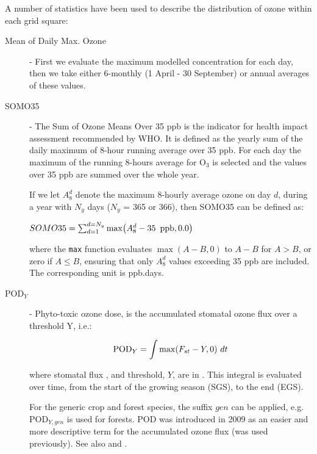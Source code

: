 \noindent

A number of statistics have been used to describe the distribution of
ozone within each grid square:\\
\begin{description}

     \item[Mean of Daily Max. Ozone] - First we evaluate the maximum
modelled concentration for each day, then we take either 6-monthly
(1 April - 30 September) or annual averages of these values.

     \item[SOMO35] - The Sum of Ozone Means Over 35 ppb is the
     indicator for health impact assessment recommended by WHO. It is
     defined as the yearly sum of the daily maximum of 8-hour running
     average over 35 ppb. For each day the maximum of the running
     8-hours average for O$_3$ is selected and the values over 35 ppb
     are summed over the whole year.

     If we let $A^d_8$ denote the
     maximum 8-hourly average ozone on day $d$, during a year with
     $N_y$ days ($N_y$ = 365 or 366), then SOMO35 can be defined as:

\begin{math}
SOMO35 = \sum_{d=1}^{d=N_y} \max\bigl(A^d_8 - 35 \mbox{\, ppb}, 0.0\bigr)
\end{math}

where the {\tt max} function evaluates $\max(A-B,0)$ to $A-B$ for $A > B$, or
zero if $A \leq B$, ensuring that only $A^d_8$ values exceeding 35
ppb are included.  The corresponding unit is ppb.days.


\item[POD$_Y$] - Phyto-toxic ozone dose, is the accumulated stomatal ozone flux over a threshold Y, i.e.:

\begin{equation}
   \mbox{POD}_{Y} = \int \max(F_{st} - Y, 0)\   dt
\end{equation}

where stomatal flux \Fst, and threshold, $Y$, are in \nmole.
This integral is evaluated over time, from the
start of the growing season (SGS), to the end (EGS).

For the generic crop and forest species, the suffix $gen$ can be
applied, e.g. POD$_{Y, gen}$ is used for forests.
POD was introduced in 2009 as an easier and  more descriptive term for the
accumulated ozone flux (\AFstY was used previously). 
See also \citet{MillsGCB2011,MillsAE2011,MillsGCB2018a} and \citet{ICP2017}.



\end{description}
